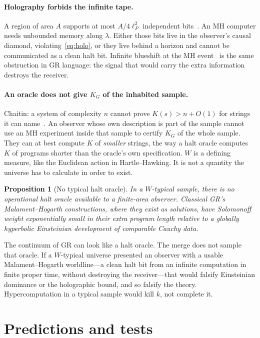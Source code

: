 \documentclass[11pt,a4paper]{article}
\theoremstyle{plain}
\newtheorem{proposition}[theorem]{Proposition}
\theoremstyle{definition}
\theoremstyle{remark}
\newcommand{\KG}{K_{G}}
\begin{document}
\paragraph{Holography forbids the infinite tape.}
A region of area $A$ supports at most $A/4\ell_{P}^{2}$ independent bits~\cite{bekenstein1981,bousso1999,bao2017}.
An MH computer needs unbounded memory along $\lambda$.
Either those bits live in the observer's causal diamond, violating~\eqref{eq:holo}, or they live behind a horizon and cannot be communicated as a clean halt bit.
Infinite blueshift at the MH event~\cite{earman1993,etesi2002} is the same obstruction in GR language: the signal that would carry the extra information destroys the receiver.

\paragraph{An oracle does not give $\KG$ of the inhabited sample.}
Chaitin: a system of complexity $n$ cannot prove $K(s)>n+O(1)$ for strings it can name~\cite{chaitin1974}.
An observer whose own description is part of the sample cannot use an MH experiment inside that sample to certify $\KG$ of the whole sample.
They can at best compute $K$ of \emph{smaller} strings, the way a halt oracle computes $K$ of programs shorter than the oracle's own specification.
$W$ is a defining measure, like the Euclidean action in Hartle--Hawking.
It is not a quantity the universe has to calculate in order to exist.

\begin{proposition}[No typical halt oracle]
\label{prop:no-halt}
In a $W$-typical sample, there is no operational halt oracle available to a finite-area observer.
Classical GR's Malament--Hogarth constructions, where they exist as solutions, have Solomonoff weight exponentially small in their extra program length relative to a globally hyperbolic Einsteinian development of comparable Cauchy data.
\end{proposition}

The continuum of GR can look like a halt oracle.
The merge does not sample that oracle.
If a $W$-typical universe presented an observer with a usable Malament--Hogarth worldline---a clean halt bit from an infinite computation in finite proper time, without destroying the receiver---that would falsify Einsteinian dominance or the holographic bound, and so falsify the theory.
Hypercomputation in a typical sample would kill $k$, not complete it.

\section{Predictions and tests}
\label{sec:predictions}
\end{document}
